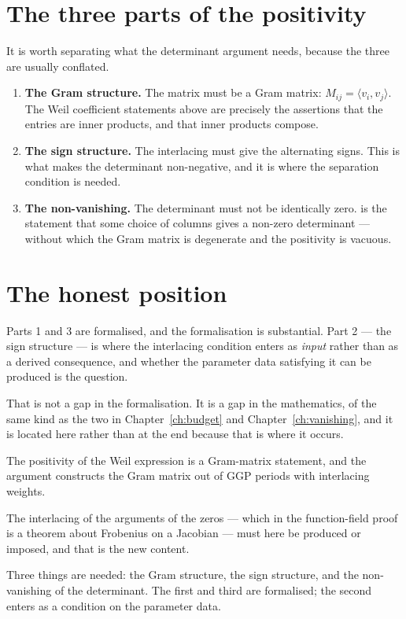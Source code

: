 \section{The three parts of the positivity}It is worth separating what the determinant argument needs, because the three
are usually conflated.

\begin{enumerate}
\item \textbf{The Gram structure.} The matrix must be a Gram matrix: $M_{ij}
= \langle v_i, v_j\rangle$. The Weil coefficient statements above are
precisely the assertions that the entries are inner products, and that inner
products compose.
\item \textbf{The sign structure.} The interlacing must give the alternating
signs. This is what makes the determinant non-negative, and it is where the
separation condition is needed.
\item \textbf{The non-vanishing.} The determinant must not be identically
zero.  is the statement that some choice of columns
gives a non-zero determinant --- without which the Gram matrix is degenerate
and the positivity is vacuous.
\end{enumerate}

\section{The honest position}Parts 1 and 3 are formalised, and the formalisation is substantial. Part 2 ---
the sign structure --- is where the interlacing condition enters as
\emph{input} rather than as a derived consequence, and whether the parameter
data satisfying it can be produced is the question.

That is not a gap in the formalisation. It is a gap in the mathematics, of the
same kind as the two in Chapter~\ref{ch:budget} and
Chapter~\ref{ch:vanishing}, and it is located here rather than at the end
because that is where it occurs.

\begin{keytakeaways}
\item The positivity of the Weil expression is a Gram-matrix statement, and
the argument constructs the Gram matrix out of GGP periods with interlacing
weights.
\item The interlacing of the arguments of the zeros --- which in the
function-field proof is a theorem about Frobenius on a Jacobian --- must here
be produced or imposed, and that is the new content.
\item Three things are needed: the Gram structure, the sign structure, and the
non-vanishing of the determinant. The first and third are formalised; the
second enters as a condition on the parameter data.
\end{keytakeaways}
